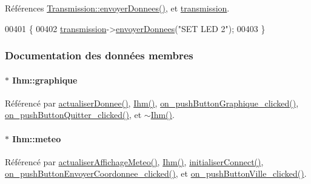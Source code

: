 Références \hyperlink{class_transmission_a21e35372ada18cd35411c0e8c0984fd7}{Transmission\+::envoyer\+Donnees()}, et \hyperlink{class_ihm_aa8fa25758a4f3e47e07d1d98f6bbab33}{transmission}.


\begin{DoxyCode}
00401 \{
00402     \hyperlink{class_ihm_aa8fa25758a4f3e47e07d1d98f6bbab33}{transmission}->\hyperlink{class_transmission_a21e35372ada18cd35411c0e8c0984fd7}{envoyerDonnees}(\textcolor{stringliteral}{"SET LED 2"});
00403 \}
\end{DoxyCode}


\subsubsection{Documentation des données membres}
\paragraph[{\texorpdfstring{graphique}{graphique}}]{$\ast$ Ihm\+::graphique\hspace{0.3cm}{\ttfamily [private]}}\hypertarget{class_ihm_a990b3fe0efe66ae9da5e13a5e0a11291}{}\label{class_ihm_a990b3fe0efe66ae9da5e13a5e0a11291}


Référencé par \hyperlink{class_ihm_a7c0a160f30e11a4f8d56b174e07566fe}{actualiser\+Donnee()}, \hyperlink{class_ihm_a50a7a15775452923868348bdbe4fa51e}{Ihm()}, \hyperlink{class_ihm_a132bd248057d7278c6841788961b5898}{on\+\_\+push\+Button\+Graphique\+\_\+clicked()}, \hyperlink{class_ihm_ac5c16e4562308547603acc9ef76df570}{on\+\_\+push\+Button\+Quitter\+\_\+clicked()}, et \hyperlink{class_ihm_add292ea9005bacd1de44dd1ed9ede5b9}{$\sim$\+Ihm()}.

\paragraph[{\texorpdfstring{meteo}{meteo}}]{$\ast$ Ihm\+::meteo\hspace{0.3cm}{\ttfamily [private]}}\hypertarget{class_ihm_af17b420166b2bb1b3e3b1c4b998a2102}{}\label{class_ihm_af17b420166b2bb1b3e3b1c4b998a2102}


Référencé par \hyperlink{class_ihm_a65487c8229375ff72290bed145876737}{actualiser\+Affichage\+Meteo()}, \hyperlink{class_ihm_a50a7a15775452923868348bdbe4fa51e}{Ihm()}, \hyperlink{class_ihm_a2ef778196b2eba5b0ab5cb4e066bc3b7}{initialiser\+Connect()}, \hyperlink{class_ihm_a850d1c97ed5fe5ba3cf3aa85d81872cd}{on\+\_\+push\+Button\+Envoyer\+Coordonnee\+\_\+clicked()}, et \hyperlink{class_ihm_aa943965aa565ec50e00f433100660892}{on\+\_\+push\+Button\+Ville\+\_\+clicked()}.

